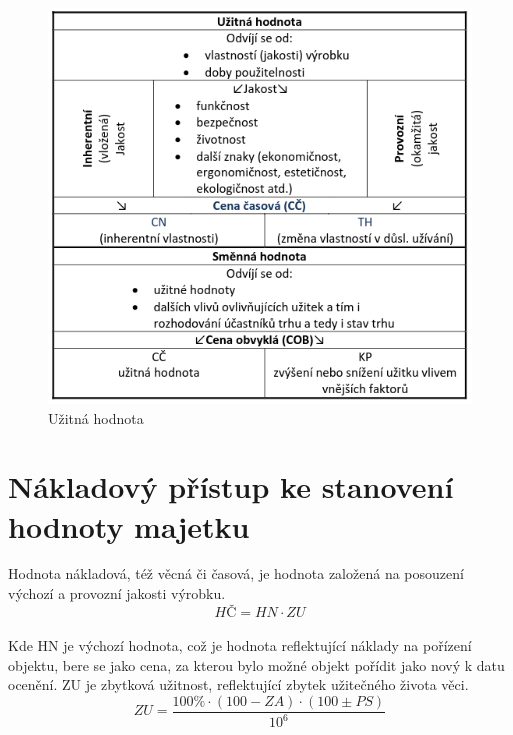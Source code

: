 \begin{figure}[h]
    \centering
    \includegraphics[scale = 0.5]{images/hodnota.png}
    \caption{Užitná hodnota}
    \label{fig:hodnota_hmotnych_veci}
\end{figure}

\section{Nákladový přístup ke stanovení hodnoty majetku}
Hodnota nákladová, též věcná či časová, je hodnota založená na posouzení výchozí a provozní jakosti výrobku.\\
\begin{equation}
    HČ = HN\cdot ZU
\end{equation}\\
Kde HN je výchozí hodnota, což je hodnota reflektující náklady na pořízení objektu, bere se jako cena, za kterou bylo možné objekt pořídit jako nový
k datu ocenění. ZU je zbytková užitnost, reflektující zbytek užitečného života věci. 
\begin{equation}
    ZU = \frac{100\%\cdot (100-ZA)\cdot (100 \pm PS)}{10^6}
\end{equation}
